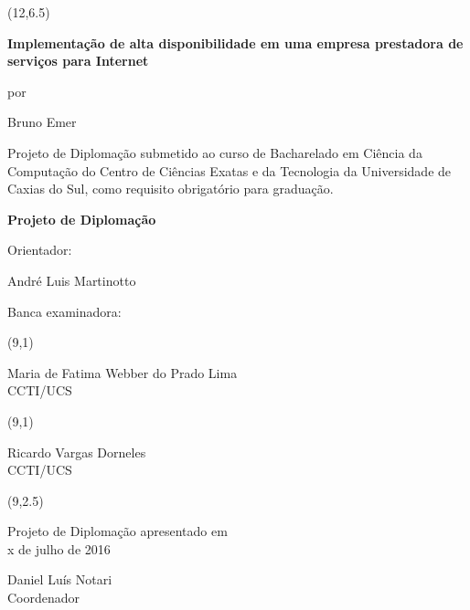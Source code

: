 \begin{titlepage}
\vfill

\begin{center}
{\setlength{\unitlength}{1cm}\makebox(12,6.5){\parbox[c]{12cm}{\setlength{\parskip}{0.8cm}\center\vskip -1.2cm\LARGE{\bf Implementação de alta disponibilidade em uma empresa prestadora de serviços para Internet}\par \normalsize por\par \large Bruno Emer\par}}}
\end{center}

{\large Projeto de Diplomação submetido ao curso de Bacharelado em Ciência da Computação do Centro de Ciências Exatas e da Tecnologia da Universidade de Caxias do Sul, como requisito obrigatório para graduação.}

\vfill

\begin{center}
{\Large\bf Projeto de Diplomação}
\end{center}

\vfill

\begin{singlespace}
Orientador: {André Luis Martinotto\par}

Banca examinadora:\par
\hspace{1cm} {\setlength{\unitlength}{1cm}
\makebox(9,1){\parbox[c]{9cm}{\center Maria de Fatima Webber do Prado Lima\\ CCTI/UCS}}}\par
\hspace{1cm} {\setlength{\unitlength}{1cm}
\makebox(9,1){\parbox[c]{9cm}{\center Ricardo Vargas Dorneles\\ CCTI/UCS}}}\par

\vfill

\hfill{\setlength{\unitlength}{1cm}\makebox(9,2.5){\parbox[c]{9cm}{\setlength{\parskip}{0.8cm}\center\vskip -1.2cm Projeto de Diplomação apresentado em\\ x de julho de 2016\par Daniel Luís Notari\\ Coordenador}}}

\end{singlespace}

\end{titlepage}
